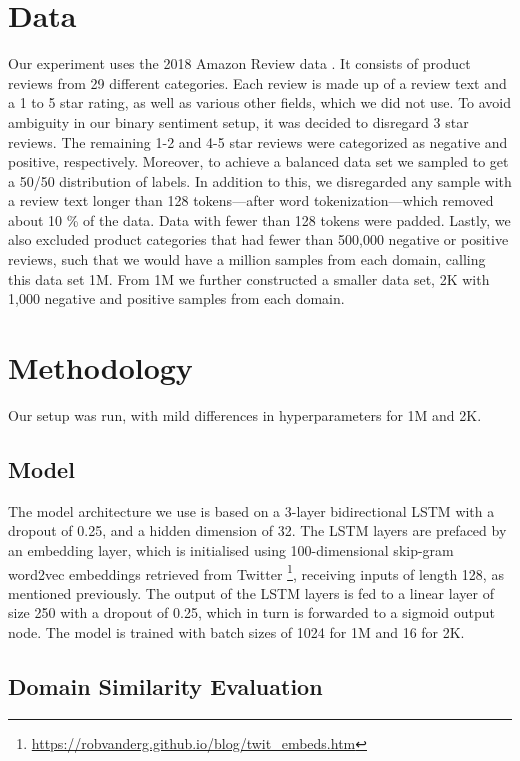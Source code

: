 \documentclass[11pt,a4paper]{article}
\begin{document}
\section*{Data}
Our experiment uses the 2018 Amazon Review data \cite{ni2019justifying}. It consists of product reviews from 29 different categories. Each review is made up of a review text and a 1 to 5 star rating, as well as various other fields, which we did not use.
To avoid ambiguity in our binary sentiment setup, it was decided to disregard 3 star reviews. The remaining 1-2 and 4-5 star reviews were categorized as negative and positive, respectively.
Moreover, to achieve a balanced data set we sampled to get a 50/50 distribution of labels.
In addition to this, we disregarded any sample with a review text longer than 128 tokens—after word tokenization—which removed about 10 \% of the data. Data with fewer than 128 tokens were padded.
Lastly, we also excluded product categories that had fewer than 500,000 negative or positive reviews, such that we would have a million samples from each domain, calling this data set 1M. From 1M we further constructed a smaller data set, 2K with 1,000 negative and positive samples from each domain.

\section*{Methodology}

Our setup was run, with mild differences in hyperparameters for 1M and 2K.

\subsection*{Model}
The model architecture we use is based on a 3-layer bidirectional LSTM \cite{sak2014long} with a dropout of 0.25, and a hidden dimension of 32.
The LSTM layers are prefaced by an embedding layer, which is initialised using 100-dimensional skip-gram word2vec embeddings retrieved from Twitter \footnote{\url{https://robvanderg.github.io/blog/twit\_embeds.htm}}, receiving inputs of length 128, as mentioned previously.
The output of the LSTM layers is fed to a linear layer of size 250 with a dropout of 0.25, which in turn is forwarded to a sigmoid output node.
The model is trained with batch sizes of 1024 for 1M and 16 for 2K.

\subsection*{Domain Similarity Evaluation}
\end{document}
